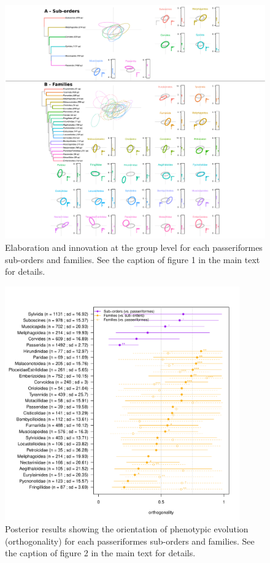 \documentclass[12pt,letterpaper]{article}
\begin{document}
\begin{figure}[!htbp]
\centering
   \includegraphics[width=1\textwidth]{Figures/ellipses_passeriformes.pdf}
\caption{Elaboration and innovation at the group level for each passeriformes sub-orders and families. See the caption of figure 1 in the main text for details.}
\label{fig_ellipses_passeriformes}
\end{figure}

\begin{figure}[!htbp]
\centering
   \includegraphics[width=0.9\textwidth]{Figures/orthogonality_results_passeriformes.pdf}
\caption{Posterior results showing the orientation of phenotypic evolution (orthogonality) for each passeriformes sub-orders and families. See the caption of figure 2 in the main text for details.}
\label{fig_orthogonality_passeriformes}
\end{figure}
\end{document}
